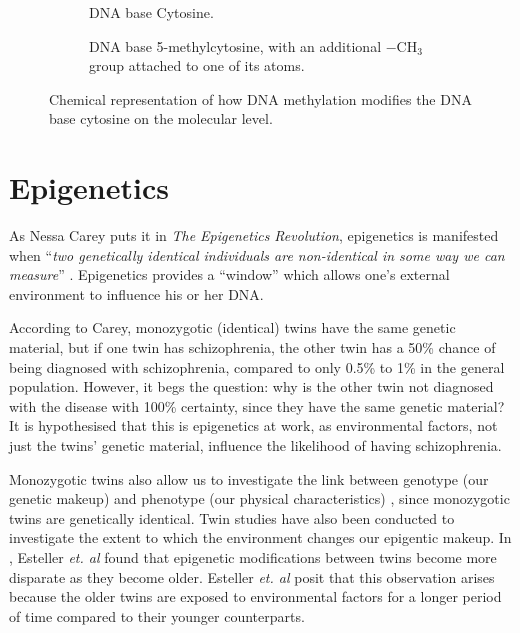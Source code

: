 \documentclass[12pt, twoside, a4paper]{report}
\begin{document}
\begin{figure}[t!]
\begin{subfigure}[t]{0.5\textwidth}
	\centering
	\caption{DNA base Cytosine.}
\end{subfigure}%
\begin{subfigure}[t]{0.5\textwidth}
	\centering
	\caption{DNA base 5-methylcytosine, with an additional $-$CH$_3$ group attached to one of its atoms.}
\end{subfigure}
\caption{Chemical representation of how DNA methylation modifies the DNA base cytosine on the molecular level.}
\label{bg:bio:methylation}
\end{figure}

\section{Epigenetics} \label{bg:epi}
As Nessa Carey puts it in \textit{The Epigenetics Revolution}, epigenetics is manifested when ``\textit{two genetically identical individuals are non-identical in some way we can measure}'' \cite{RefWorks:248}. Epigenetics provides a ``window'' which allows one's external environment to influence his or her DNA.

According to Carey, monozygotic (identical) twins have the same genetic material, but if one twin has schizophrenia, the other twin has a 50\% chance of being diagnosed with schizophrenia, compared to only 0.5\% to 1\% in the general population. However, it begs the question: why is the other twin not diagnosed with the disease with 100\% certainty, since they have the same genetic material? It is hypothesised that this is epigenetics at work, as environmental factors, not just the twins' genetic material, influence the likelihood of having schizophrenia.

Monozygotic twins also allow us to investigate the link between genotype (our genetic makeup) and phenotype (our physical characteristics) \cite{RefWorks:104, RefWorks:250}, since monozygotic twins are genetically identical. Twin studies have also been conducted to investigate the extent to which the environment changes our epigentic makeup. In \cite{RefWorks:251}, Esteller \textit{et. al} found that epigenetic modifications between twins become more disparate as they become older. Esteller \textit{et. al} posit that this observation arises because the older twins are exposed to environmental factors for a longer period of time compared to their younger counterparts.
\end{document}
